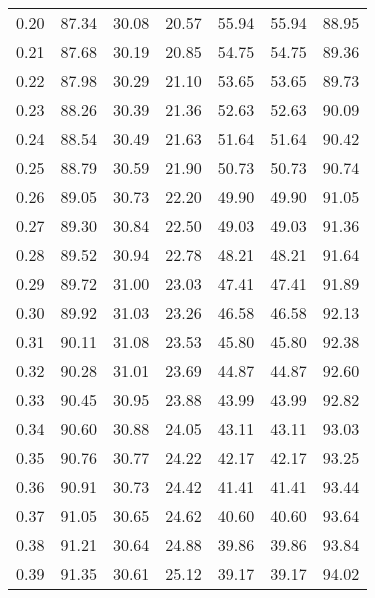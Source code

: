 \begin{tabular}{|c|c|c|c|c|c|c|}
      0.20 &     87.34 &     30.08 &      20.57 &   55.94 &      55.94 &         88.95 \\
      0.21 &     87.68 &     30.19 &      20.85 &   54.75 &      54.75 &         89.36 \\
      0.22 &     87.98 &     30.29 &      21.10 &   53.65 &      53.65 &         89.73 \\
      0.23 &     88.26 &     30.39 &      21.36 &   52.63 &      52.63 &         90.09 \\
      0.24 &     88.54 &     30.49 &      21.63 &   51.64 &      51.64 &         90.42 \\
      0.25 &     88.79 &     30.59 &      21.90 &   50.73 &      50.73 &         90.74 \\
      0.26 &     89.05 &     30.73 &      22.20 &   49.90 &      49.90 &         91.05 \\
      0.27 &     89.30 &     30.84 &      22.50 &   49.03 &      49.03 &         91.36 \\
      0.28 &     89.52 &     30.94 &      22.78 &   48.21 &      48.21 &         91.64 \\
      0.29 &     89.72 &     31.00 &      23.03 &   47.41 &      47.41 &         91.89 \\
      0.30 &     89.92 &     31.03 &      23.26 &   46.58 &      46.58 &         92.13 \\
      0.31 &     90.11 &     31.08 &      23.53 &   45.80 &      45.80 &         92.38 \\
      0.32 &     90.28 &     31.01 &      23.69 &   44.87 &      44.87 &         92.60 \\
      0.33 &     90.45 &     30.95 &      23.88 &   43.99 &      43.99 &         92.82 \\
      0.34 &     90.60 &     30.88 &      24.05 &   43.11 &      43.11 &         93.03 \\
      0.35 &     90.76 &     30.77 &      24.22 &   42.17 &      42.17 &         93.25 \\
      0.36 &     90.91 &     30.73 &      24.42 &   41.41 &      41.41 &         93.44 \\
      0.37 &     91.05 &     30.65 &      24.62 &   40.60 &      40.60 &         93.64 \\
      0.38 &     91.21 &     30.64 &      24.88 &   39.86 &      39.86 &         93.84 \\
      0.39 &     91.35 &     30.61 &      25.12 &   39.17 &      39.17 &         94.02 \\

\end{tabular}
